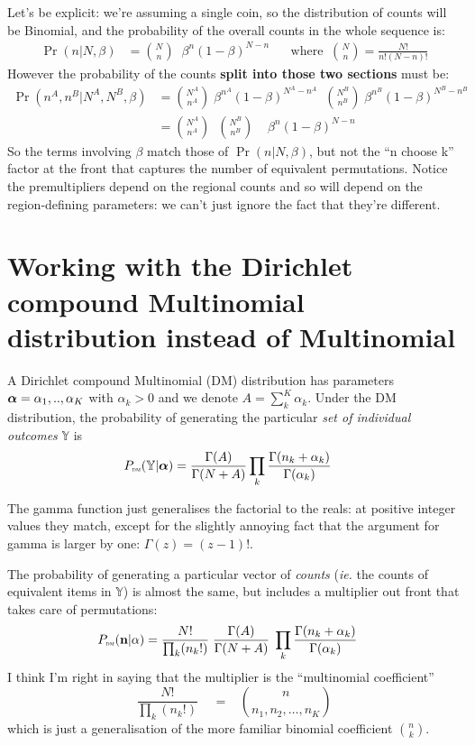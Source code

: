 \documentclass[12pt]{article}
\begin{document}
Let's be explicit:  we're assuming a single coin, so the distribution of counts will
be Binomial, and the probability of the overall counts in the whole sequence is:
\begin{align*}
\Pr(n | N,\beta) &= {N \choose n} \;\; \beta^n (1-\beta)^{N-n}
\;\;\;\;\;\; \text{where} \;\;{N \choose n} = \frac{N!}{n! (N-n)!} 
\end{align*}
However the probability of the counts {\bf split into those two sections} must be:
\begin{align*}
  \Pr(n^A, n^B| N^A,N^B,\beta) &= 
{N^A \choose n^A}
 \; \beta^{n^A} (1-\beta)^{N^A-n^A}  \;\; {N^B \choose n^B} \;\beta^{n^B} (1-\beta)^{N^B-n^B} \\
  &= {N^A \choose n^A} \;\; {N^B \choose n^B} \;\; \;\; \beta^{n}   (1-\beta)^{N-n}
\end{align*}
So the terms involving $\beta$ match those of $\Pr(n | N,\beta)$, but
not the ``n choose k'' factor at the front that captures the number of
equivalent permutations. Notice the premultipliers depend on the
regional counts and so will depend on the region-defining parameters:
we can't just ignore the fact that they're different.


\section{Working with the Dirichlet compound Multinomial distribution instead of Multinomial}
A Dirichlet compound Multinomial (DM) distribution has parameters
$\boldsymbol\alpha = \alpha_1,..,\alpha_K$ with $\alpha_k > 0$ and we denote $ A
= \sum_k^K \alpha_k$. Under the DM distribution, the probability of
generating the particular {\it set of individual outcomes}
$\mathbb{Y}$ is
\begin{align}
P_\text{\tiny\sc dm}(\mathbb{Y} |\boldsymbol\alpha) &= \frac{\Gamma(A)}{\Gamma(N+A)} \prod_k \frac{\Gamma(n_k+\alpha_k)}{\Gamma(\alpha_k)}  \label{eq:DMvalues}
\end{align}

The gamma function just generalises the factorial to the reals: at
positive integer values they match, except for the slightly annoying
fact that the argument for gamma is larger by one: $\Gamma(z) =
(z-1)!$.

The probability of generating a particular vector of {\it counts}
({\it ie.} the counts of equivalent items in $\mathbb{Y}$) is almost
the same, but includes a multiplier out front that takes care of
permutations:
\begin{align}
P_\text{\tiny\sc dm}(\mathbf{n} |\alpha) &= \frac{N!}{\prod_k (n_k!)} \;
 \frac{\Gamma(A)}{\Gamma(N+A)} \;\prod_k \frac{\Gamma(n_k+\alpha_k)}{\Gamma(\alpha_k)}  \label{eq:DMcounts}
\end{align}
I think I'm right in saying that the multiplier is the ``multinomial coefficient''
\[
\frac{N!}{\prod_k (n_k!)} \;
\;\;\; = \;\;\; 
{n \choose n_1, n_2,\ldots,n_K}
\]
which is just a generalisation of the more familiar binomial coefficient ${n \choose k}$.
\end{document}
